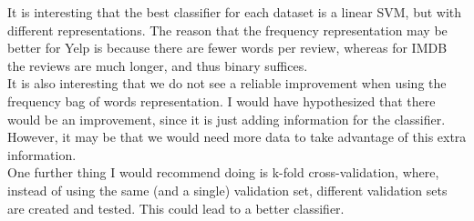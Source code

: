 \documentclass[11pt]{article}
\begin{document}
It is interesting that the best classifier for each dataset is a linear SVM, but with different representations. The reason that the frequency representation may be better for Yelp is because there are fewer words per review, whereas for IMDB the reviews are much longer, and thus binary suffices.\\

It is also interesting that we do not see a reliable improvement when using the frequency bag of words representation. I would have hypothesized that there would be an improvement, since it is just adding information for the classifier. However, it may be that we would need more data to take advantage of this extra information.\\

One further thing I would recommend doing is k-fold cross-validation, where, instead of using the same (and a single) validation set, different validation sets are created and tested. This could lead to a better classifier.
\end{document}

